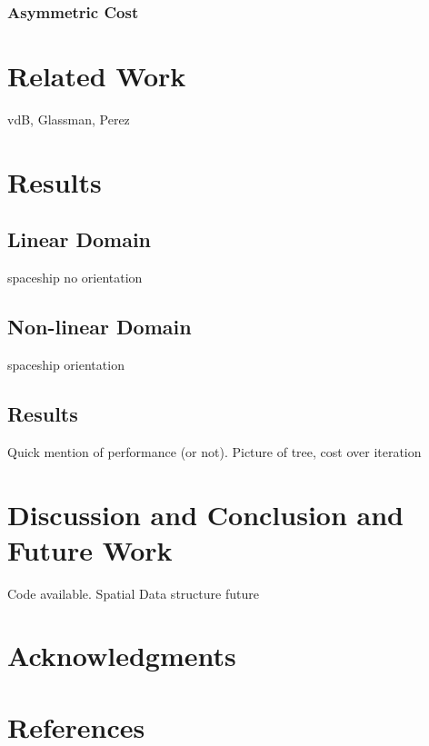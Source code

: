 \documentclass[letterpaper, 10pt, english, conference]{IEEEtran}
\begin{document}
\subsubsection{Asymmetric Cost}

\begin{comment}
http://math.stackexchange.com/a/23397/2256
\end{comment}



\section{Related Work}

vdB, Glassman, Perez


\section{Results}


\subsection{Linear Domain}

spaceship no orientation


\subsection{Non-linear Domain}

spaceship orientation


\subsection{Results}

Quick mention of performance (or not). Picture of tree, cost over
iteration


\section{Discussion and Conclusion and Future Work}

Code available. Spatial Data structure future


\section{Acknowledgments}


\section{References}


\end{document}
